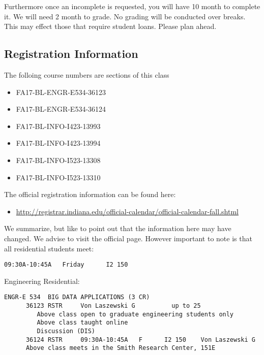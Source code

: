 Furthermore once an incomplete is requested, you will have 10 month to
complete it. We will need 2 month to grade. No grading will be conducted
over breaks. This may effect those that require student loans. Please
plan ahead.

\subsection{Registration Information}\label{registration-information}

The folloing course numbers are sections of this class

\begin{itemize}

\item
  FA17-BL-ENGR-E534-36123
\item
  FA17-BL-ENGR-E534-36124
\item
  FA17-BL-INFO-I423-13993
\item
  FA17-BL-INFO-I423-13994
\item
  FA17-BL-INFO-I523-13308
\item
  FA17-BL-INFO-I523-13310
\end{itemize}

The official registration information can be found here:

\begin{itemize}

\item
  \url{http://registrar.indiana.edu/official-calendar/official-calendar-fall.shtml}
\end{itemize}

We summarize, but like to point out that the information here may have
changed. We advise to visit the official page. However important to note
is that all residential students meet:

\begin{verbatim}
09:30A-10:45A   Friday      I2 150 
\end{verbatim}

Engineering Residential:

\begin{verbatim}
ENGR-E 534  BIG DATA APPLICATIONS (3 CR)
      36123 RSTR     Von Laszewski G          up to 25
         Above class open to graduate engineering students only
         Above class taught online
         Discussion (DIS)
      36124 RSTR     09:30A-10:45A   F      I2 150    Von Laszewski G
      Above class meets in the Smith Research Center, 151E
\end{verbatim}

